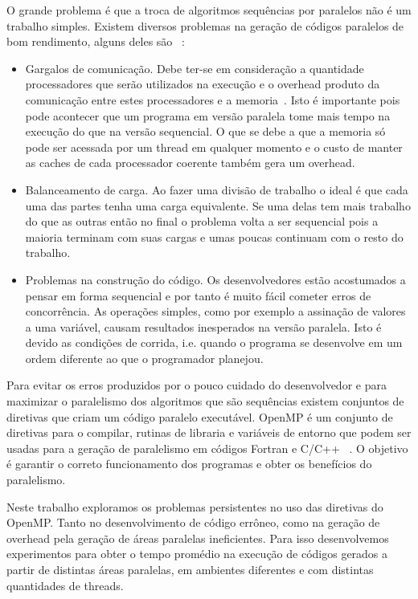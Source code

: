 \documentclass[a4paper,12pt,fleqn]{article}
\begin{document}
O grande problema é que a troca de algoritmos sequências por paralelos não é um trabalho simples. Existem diversos problemas na geração de códigos paralelos de bom rendimento, alguns deles são ~\cite{Matloff14}: 
\begin{itemize} 
    \item Gargalos de comunicação. Debe ter-se em consideração a quantidade processadores que serão utilizados na execução e o overhead produto da comunicação entre estes processadores e a memoria~\cite{Gebali11}. Isto é importante pois pode acontecer que um programa em versão paralela tome mais tempo na execução do que na versão sequencial. O que se debe a que a memoria só pode ser acessada por um thread em qualquer momento e o custo de manter as caches de cada processador coerente também gera um overhead. 
    \item Balanceamento de carga. Ao fazer uma divisão de trabalho o ideal é que cada uma das partes tenha uma carga equivalente. Se uma delas tem mais trabalho do que as outras então no final o problema volta a ser sequencial pois a maioria terminam com suas cargas e umas poucas continuam com o resto do trabalho. 
    \item Problemas na construção do código. Os desenvolvedores estão acostumados a pensar em forma sequencial e por tanto é muito fácil cometer erros de concorrência. As operações simples, como por exemplo a assinação de valores a uma variável, causam resultados inesperados na versão paralela. Isto é devido as condições de corrida, i.e. quando o programa se desenvolve em um ordem diferente ao que o programador planejou. 
\end{itemize} 
 Para evitar os erros produzidos por o pouco cuidado do desenvolvedor e para maximizar o paralelismo dos algoritmos que são sequências existem conjuntos de diretivas que criam um código paralelo executável. OpenMP é um conjunto de diretivas para o compilar, rutinas de libraria e variáveis de entorno que podem ser usadas para a geração de paralelismo em códigos Fortran e C/C++ ~\cite{OpenMP13}. O objetivo é garantir o correto funcionamento dos programas e obter os benefícios do paralelismo. 
 
Neste trabalho exploramos os problemas persistentes no uso das diretivas do OpenMP. Tanto no desenvolvimento de código errôneo, como na geração de overhead pela geração de áreas paralelas ineficientes. Para isso desenvolvemos experimentos para obter o tempo promédio na execução de códigos gerados a partir de distintas áreas paralelas, em ambientes diferentes e com distintas quantidades de threads. 
 
\end{document}
